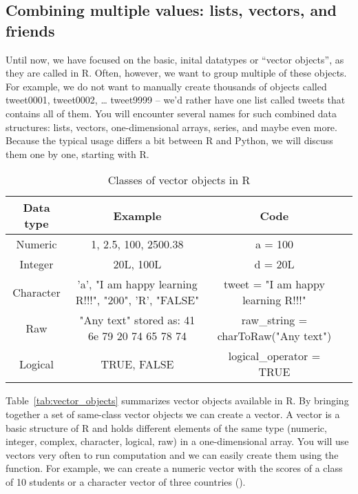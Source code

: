 \subsection{Combining multiple values: lists, vectors, and friends}

Until now, we have focused on the basic, inital datatypes or ``vector
objects'', as they are called in R.  Often, however, we want to group
multiple of these objects. For example, we do not want to manually
create thousands of objects called tweet0001, tweet0002, \ldots
tweet9999 -- we'd rather have one list called tweets that contains all
of them. You will encounter several names for such combined data
structures: lists, vectors, one-dimensional arrays, series, and maybe
even more. Because the typical usage differs a bit between R and
Python, we will discuss them one by one, starting with R.


\begin{table}[ht]
\label{tab:vector_objects}
\caption{Classes of vector objects in R\label{table:nonlin}}{%
\centering
\begin{tabular}{c c c p{2cm}}
\hline\hline
Data type & Example & Code \\ [0.5ex]
\hline
Numeric&1, 2.5, 100, 2500.38& a = 100 \\
Integer&20L, 100L&d = 20L \\
Character&   \parbox[t]{4cm}{\centering 'a', "I am happy learning R!!!", "200", 'R', "FALSE"} & tweet  = "I am happy learning R!!!" \\
Raw& \parbox[t]{4cm}{\centering "Any text" stored as:  41 6e 79 20 74 65 78 74} & raw\_string  = charToRaw("Any text") \\
Logical& TRUE, FALSE & logical\_operator  = TRUE  \\ [1ex]
\hline
\end{tabular}}{}
\end{table}


Table~\ref{tab:vector_objects} summarizes vector objects available in
R. By bringing together a set of same-class vector objects we can
create a vector. A vector is a basic structure of R and holds
different elements of the same type (numeric, integer, complex,
character, logical, raw) in a one-dimensional array. You will use
vectors very often to run computation and we can easily create them
using the  function. For example, we can create a numeric vector
with the scores of a class of 10 students or a character vector of
three countries ().

